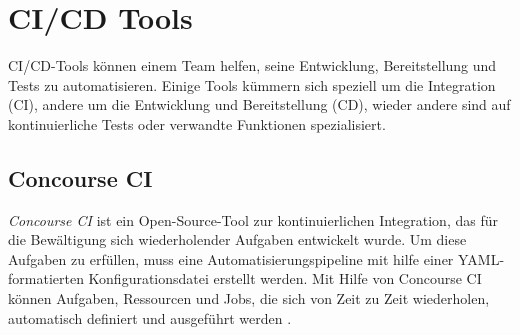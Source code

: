 \pagebreak

\section{CI/CD Tools}

CI/CD-Tools können einem Team helfen, seine Entwicklung, Bereitstellung und Tests zu automatisieren. Einige Tools kümmern sich speziell um die Integration (CI), andere um die Entwicklung und Bereitstellung (CD), wieder andere sind auf kontinuierliche Tests oder verwandte Funktionen spezialisiert.

\subsection{Concourse CI}

\textit{Concourse CI} ist ein Open-Source-Tool zur kontinuierlichen Integration, das für die Bewältigung sich wiederholender Aufgaben entwickelt wurde. Um diese Aufgaben zu erfüllen, muss eine Automatisierungspipeline mit hilfe einer YAML-formatierten Konfigurationsdatei erstellt werden. Mit Hilfe von Concourse CI können Aufgaben, Ressourcen und Jobs, die sich von Zeit zu Zeit wiederholen, automatisch definiert und ausgeführt werden \cite{ConcourseCI:homepage}.

